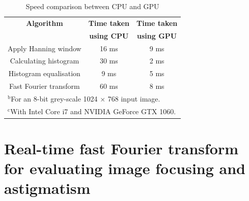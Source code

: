 \documentclass[12pt, conference]{IEEEtran}
\begin{document}
\begin{table}[htbp]
    \caption{Speed comparison between CPU and GPU}
    \begin{center}
    \begin{tabular}{|c|c|c|}
    \hline
    \textbf{Algorithm} & \textbf{Time taken} & \textbf{Time taken} \\
    & \textbf{using CPU} & \textbf{using GPU} \\
    \hline
    Apply Hanning window & 16 ms & 9 ms \\
    \hline
    Calculating histogram & 30 ms & 2 ms \\
    \hline
    Histogram equalisation & 9 ms & 5 ms \\
    \hline
    Fast Fourier transform & 60 ms & 8 ms \\
    \hline
    \multicolumn{3}{l}{$^{\mathrm{b}}$For an 8-bit grey-scale 1024 $\times$ 768 input image.} \\
    \multicolumn{3}{l}{$^{\mathrm{c}}$With Intel Core i7 and NVIDIA GeForce GTX 1060.}
    \end{tabular}
    \label{Software speed comparison}
    \end{center}
\end{table}

\section{Real-time fast Fourier transform for evaluating image focusing and astigmatism}
\label{Section FFT}

\end{document}
